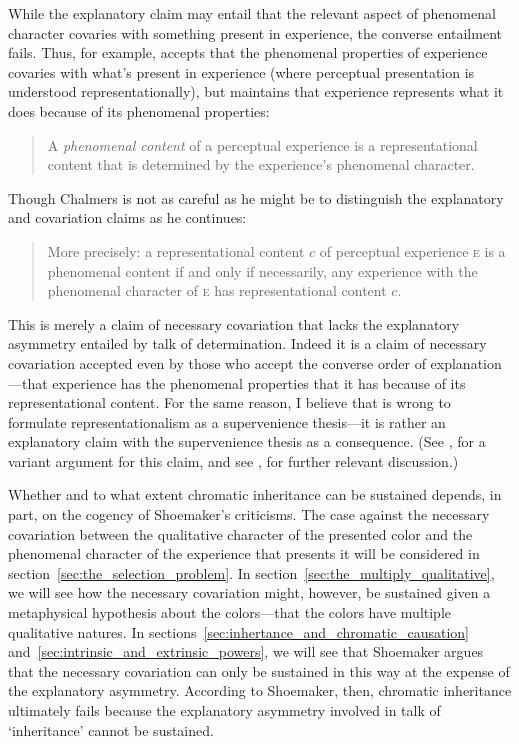 \documentclass[12pt]{article}
\begin{document}
While the explanatory claim may entail that the relevant aspect of phenomenal character covaries with something present in experience, the converse entailment fails. Thus, for example, \citet{Chalmers:2006kx} accepts that the phenomenal properties of experience covaries with what's present in experience (where perceptual presentation is understood representationally), but maintains that experience represents what it does because of its phenomenal properties: 
\begin{quote}
	A \emph{phenomenal content} of a perceptual experience is a representational content that is determined by the experience's phenomenal character. \citep[50]{Chalmers:2006kx} 
\end{quote}
Though Chalmers is not as careful as he might be to distinguish the explanatory and covariation claims as he continues: 
\begin{quote}
	More precisely: a representational content $c$ of perceptual experience \textsc{e} is a phenomenal content if and only if necessarily, any experience with the phenomenal character of \textsc{e} has representational content $c$. \citep[50]{Chalmers:2006kx} 
\end{quote}
This is merely a claim of necessary covariation that lacks the explanatory asymmetry entailed by talk of determination. Indeed it is a claim of necessary covariation accepted even by those who accept the converse order of explanation---that experience has the phenomenal properties that it has because of its representational content. For the same reason, I believe that \citet{Byrne:2001dq} is wrong to formulate representationalism as a supervenience thesis---it is rather an explanatory claim with the supervenience thesis as a consequence. (See \citealp{Hilbert:2000on}, for a variant argument for this claim, and see \citealp{Martin:2002cr}, for further relevant discussion.)

Whether and to what extent chromatic inheritance can be sustained depends, in part, on the cogency of Shoemaker's criticisms. The case against the necessary covariation between the qualitative character of the presented color and the phenomenal character of the experience that presents it will be considered in section~\ref{sec:the_selection_problem}. In section~\ref{sec:the_multiply_qualitative}, we will see how the necessary covariation might, however, be sustained given a metaphysical hypothesis about the colors---that the colors have multiple qualitative natures. In sections~\ref{sec:inhertance_and_chromatic_causation} and~\ref{sec:intrinsic_and_extrinsic_powers}, we will see that Shoemaker argues that the necessary covariation can only be sustained in this way at the expense of the explanatory asymmetry. According to Shoemaker, then, chromatic inheritance ultimately fails because the explanatory asymmetry involved in talk of `inheritance' cannot be sustained. 
\end{document}

